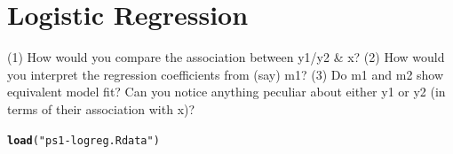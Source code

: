 \documentclass[letterpaper,12pt]{article}\usepackage[]{graphicx}\usepackage[]{color}
\makeatletter
\newcommand{\hlstr}[1]{\textcolor[rgb]{0.192,0.494,0.8}{#1}}%
\newcommand{\hlstd}[1]{\textcolor[rgb]{0.345,0.345,0.345}{#1}}%
\newcommand{\hlkwd}[1]{\textcolor[rgb]{0.737,0.353,0.396}{\textbf{#1}}}%
\newenvironment{kframe}{%
 \def\at@end@of@kframe{}%
 \ifinner\ifhmode%
  \def\at@end@of@kframe{\end{minipage}}%
  \begin{minipage}{\columnwidth}%
 \fi\fi%
 \def\FrameCommand##1{\hskip\@totalleftmargin \hskip-\fboxsep
 \colorbox{shadecolor}{##1}\hskip-\fboxsep
     \hskip-\linewidth \hskip-\@totalleftmargin \hskip\columnwidth}%
 \MakeFramed {\advance\hsize-\width
   \@totalleftmargin\z@ \linewidth\hsize
   \@setminipage}}%
 {\par\unskip\endMakeFramed%
 \at@end@of@kframe}
\newenvironment{knitrout}{}{} %
\numberwithin{equation}{section}
\makeatother
\begin{document}
\pagebreak
\section{Logistic Regression}

(1) How would you compare the association between y1/y2 \& x? (2) How would you interpret the regression coefficients from (say) m1? (3) Do m1 and m2 show equivalent model fit? Can you notice anything peculiar about either y1 or y2 (in terms of their association with x)?

\begin{knitrout}
\color{fgcolor}\begin{kframe}
\begin{alltt}
\hlkwd{load}\hlstd{(}\hlstr{"ps1-logreg.Rdata"}\hlstd{)}


\end{alltt}
\end{kframe}
\end{knitrout}
\end{document}
